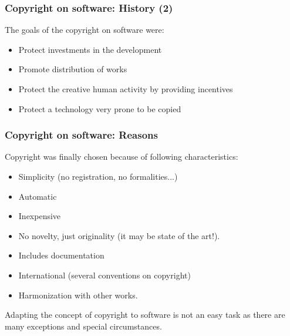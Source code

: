 \documentclass{beamer}
\begin{document}

\begin{frame}
\frametitle{Copyright on software: History (2)}

The goals of the copyright on software were:

\begin{itemize}
\item Protect investments in the development
\item Promote distribution of works
\item Protect the creative human activity by providing incentives
\item Protect a technology very prone to be copied
\end{itemize}

\end{frame}



\begin{frame}
\frametitle{Copyright on software: Reasons}

Copyright was finally chosen because of following characteristics:

\begin{itemize}
\item Simplicity (no registration, no formalities...)
\item Automatic
\item Inexpensive
\item No novelty, just originality (it may be state of the art!). 
\item Includes documentation
\item International (several conventions on copyright)
\item Harmonization with other works.
\end{itemize}

\small
\begin{center}
\alert{Adapting the concept of copyright to software is not an easy task as
there are many exceptions and special circumstances.}
\end{center}

\end{frame}


\end{document}
